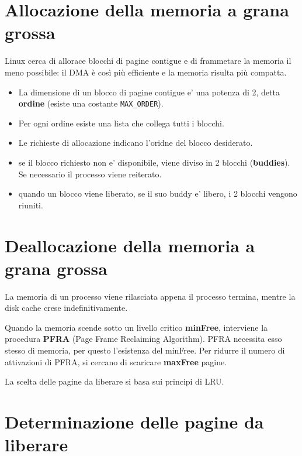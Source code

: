 \documentclass[12pt, a4paper]{report}
\begin{document}
\section{Allocazione della memoria a grana grossa}
Linux cerca di allorace blocchi di pagine contigue e di frammetare la memoria il
meno possibile: il DMA è così più efficiente e la memoria risulta più compatta.

\begin{itemize}
	\item La dimensione di un blocco di pagine contigue e' una potenza di 2,
		detta \textbf{ordine} (esiste una costante \texttt{MAX\_ORDER}).
	\item Per ogni ordine esiste una lista che collega tutti i blocchi.
	\item Le richieste di allocazione indicano l'oridne del blocco desiderato.
	\item se il blocco richiesto non e' disponibile, viene diviso in 2 blocchi
		(\textbf{buddies}). Se necessario il processo viene reiterato.
	\item quando un blocco viene liberato, se il suo buddy e' libero, i 2
		blocchi vengono riuniti.
\end{itemize}

\section{Deallocazione della memoria a grana grossa}
La memoria di un processo viene rilasciata appena il processo termina, mentre la
disk cache crese indefinitivamente.

Quando la memoria scende sotto un livello critico \textbf{minFree}, interviene
la procedura \textbf{PFRA} (Page Frame Reclaiming Algorithm). PFRA necessita
esso stesso di memoria, per questo l'esistenza del minFree. Per ridurre il
numero di attivazioni di PFRA, si cercano di scaricare \textbf{maxFree} pagine.

La scelta delle pagine da liberare si basa sui principi di LRU.

\section{Determinazione delle pagine da liberare}
\end{document}

